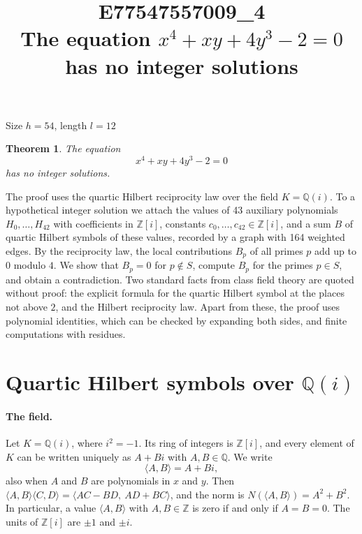 \documentclass[11pt]{article}
\title{\textbf{E77547557009\_4}\\[4pt] {\Large The equation $x^{4}+xy+4y^{3}-2=0$ has no integer solutions}}
\author{}
\date{}
\newtheorem{theorem}{Theorem}
\newcommand{\Z}{\mathbb{Z}}
\newcommand{\Q}{\mathbb{Q}}
\begin{document}
\maketitle
\vspace{-8ex}
\begin{center}
Size $h=54$, length $l=12$
\end{center}

\begin{theorem}\label{thm:main}
The equation
\begin{equation}\label{eq:main}
x^{4}+xy+4y^{3}-2=0
\end{equation}
has no integer solutions.
\end{theorem}

The proof uses the quartic Hilbert reciprocity law over the field $K=\Q(i)$. To a hypothetical integer solution we attach the values of 43 auxiliary polynomials $H_0,\dots,H_{42}$ with coefficients in $\Z[i]$, constants $c_0,\dots,c_{42}\in\Z[i]$, and a sum $B$ of quartic Hilbert symbols of these values, recorded by a graph with 164 weighted edges. By the reciprocity law, the local contributions $B_p$ of all primes $p$ add up to $0$ modulo $4$. We show that $B_p=0$ for $p\notin S$, compute $B_p$ for the primes $p\in S$, and obtain a contradiction. Two standard facts from class field theory are quoted without proof: the explicit formula for the quartic Hilbert symbol at the places not above $2$, and the Hilbert reciprocity law. Apart from these, the proof uses polynomial identities, which can be checked by expanding both sides, and finite computations with residues.


\section{\texorpdfstring{Quartic Hilbert symbols over $\Q(i)$}{Quartic Hilbert symbols over Q(i)}}\label{sec:symbols}

\paragraph{The field.} Let $K=\Q(i)$, where $i^2=-1$. Its ring of integers is $\Z[i]$, and every element of $K$ can be written uniquely as $A+Bi$ with $A,B\in\Q$. We write
\[
\langle A,B\rangle=A+Bi,
\]
also when $A$ and $B$ are polynomials in $x$ and $y$. Then $\langle A,B\rangle\langle C,D\rangle=\langle AC-BD,\ AD+BC\rangle$, and the norm is $N(\langle A,B\rangle)=A^2+B^2$. In particular, a value $\langle A,B\rangle$ with $A,B\in\Z$ is zero if and only if $A=B=0$. The units of $\Z[i]$ are $\pm1$ and $\pm i$.
\end{document}

